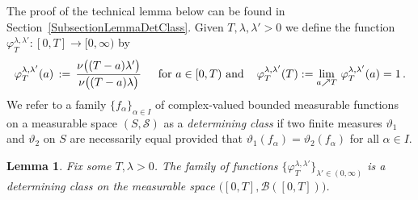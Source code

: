 \documentclass[10pt]{article}
\numberwithin{equation}{section}
\newtheorem{lemma}[theorem]{Lemma}
\theoremstyle{definition}
\begin{document}
The proof of the technical lemma below can be found in Section~\ref{SubsectionLemmaDetClass}. Given $T,\lambda,\lambda'>0$ we define the function $\varphi_T^{\lambda,\lambda'}:[0,T]\rightarrow [0,\infty) $ by  
\begin{align}\label{PHI}
\varphi_T^{\lambda,\lambda'}(a)\, :=\,\frac{ \nu\big((T-a)\lambda'\big)   }{ \nu\big((T-a)\lambda\big)  } \hspace{.4cm} \text{ for $a\in [0,T)$ and}   \hspace{.4cm} \varphi_T^{\lambda,\lambda'}(T):=\lim_{a\nearrow T}\,\varphi_T^{\lambda,\lambda'}(a)=1\,.
\end{align}
We refer to a family $\{f_{\alpha}\}_{\alpha\in I}$ of complex-valued  bounded measurable functions  on a measurable  space $(S,\mathcal{S})$ as a \textit{determining class} if two finite  measures $\vartheta_1$ and $\vartheta_2$ on $S$ are necessarily equal provided that  $\vartheta_1(f_{\alpha})=\vartheta_2(f_{\alpha})$ for all $\alpha\in I$. 
\begin{lemma} \label{LemmaDetClass}
Fix some  $T,\lambda>0$. The family of functions $\big\{ \varphi_T^{\lambda,\lambda'} \big\}_{\lambda'\in (0,\infty)}$ is a determining class  on the measurable space $\big([0,T],\mathscr{B}([0,T])\big)$.
\end{lemma}
\end{document}
